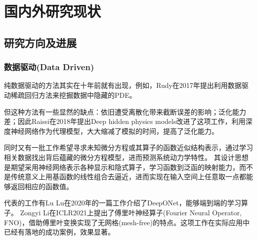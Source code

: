 
\section{国内外研究现状}
\subsection{研究方向及进展}
\subsubsection{数据驱动(Data Driven)}
纯数据驱动的方法其实在十年前就有出现，例如，Rudy在2017年提出利用数据驱动稀疏回归方法来挖掘数据中隐藏的PDE\cite{data-driven_discovery_of_pde}。

但这种方法有一些显然的缺点：依旧遭受离散化带来截断误差的影响；泛化能力差；因此Raissi在2018年提出Deep hidden physics models\cite{10.5555/3291125.3291150}改进了这项工作，利用深度神经网络作为代理模型，大大缩减了模拟的时间，提高了泛化能力。

同时又有一批工作希望寻求未知微分方程或其算子的函数近似结构表示，通过学习相关数据找出背后蕴藏的微分方程模型，进而预测系统动力学特性。
其设计思想是期望采用神经网络表示各种显示和隐式算子，学习函数到泛函的映射能力，而不是传统意义上用基函数的线性组合去逼近，进而实现在输入空间上任意取一点都能够返回相应的函数值。

代表的工作有Lu Lu在2020年的一篇工作介绍了DeepONet\cite{lu2021learning}，能够端到端的学习算子。
Zongyi Li在ICLR2021上提出了傅里叶神经算子(Fourier Neural Operator, FNO)\cite{FNO}，借助傅里叶变换实现了无网格(mesh-free)的特点。这项工作在实际应用中已经有落地的成功案例，效果显著。


